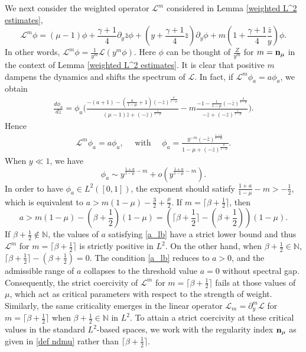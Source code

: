 \documentclass{article}
\newcommand{\ga}{\gamma}
\newcommand{\pa}{\partial}
\def\be{\begin{equation}}
\def\ee{\end{equation}}
\def\beqa{\begin{equation}\begin{aligned}}
\def\eeqa{\end{aligned}\end{equation}}
\def\ndmu{{\bf{n}_{\mu}}}
\numberwithin{equation}{section}
\begin{document}
We next consider the weighted operator 
$\mathcal L^m$ considered in Lemma \ref{weighted L^2 estimates}, 
\be
    \mathcal L^m \phi= (\mu-1)\phi +\frac{\ga+1}{4}\pa_y \bar z \phi +(y+\frac{\ga+1}{4}\bar z ) \pa_y \phi + m(1+\frac{\ga+1}{4}\frac{\bar z}{y})\phi.
\ee
In other words, $\mathcal L^m \phi = \frac{1}{y^m} \mathcal L (y^m \phi) $. Here $\phi$ can be thought of $\frac{Z}{y^m}$ for $m=\ndmu$ in the context of Lemma  \ref{weighted L^2 estimates}. It is clear that positive $m$ dampens the dynamics and shifts the spectrum of $\mathcal L$. %
In fact, if $\mathcal L^m  \phi_a = a\phi_a$, 
we obtain
\begin{align*}
    \frac{d\phi_a}{d \bar z} =  \phi_a \Big(\frac{-(a+1)-(\frac{a}{1-\mu}+1)(-\bar z)^{\frac{\mu}{1-\mu}}}{(\mu-1)\bar z +(-\bar z)^\frac{1}{1-\mu}}-m\frac{ -1-\frac{1}{1-\mu}(-\bar z)^{\frac{\mu}{1-\mu}} }{-\bar z +(-\bar z)^{\frac{1}{1-\mu}}}\Big).
\end{align*}
Hence
\beqa
    \mathcal L^m \phi_a  = a\phi_a,\quad \text{ with } \quad \phi_a = \frac{y^{-m}(-\bar z)^{\frac{1+a}{1-\mu}}}{1-\mu+(-\bar z )^{\frac{\mu}{1-\mu}}}.
\eeqa
When $y\ll 1$, we have
\be
    \phi_a \sim y^{\frac{1+a}{1-\mu}-m} + o(y^{\frac{1+a}{1-\mu}-m}).
\ee
In order to have $\phi_a\in L^2([0,1])$, the exponent should satisfy $\frac{1+a}{1-\mu}-m >-\frac12$, which is equivalent to $a> m(1-\mu)-\frac{3}{2}+\frac{\mu}{2}$. If $m=\lceil \beta+\frac12 \rceil$, then 
\be\label{a_lb}
   a> m(1-\mu) - (\beta+\frac12)(1-\mu) = ( \lceil \beta+\frac12 \rceil-(\beta+\frac12))(1-\mu).  %
\ee
If $\beta+\frac12 \notin \mathbb N $, the values of $a$ satisfying \eqref{a_lb}  have a strict lower bound and thus $\mathcal L^m$ for $m={\lceil \beta+\frac12 \rceil}$ is strictly positive in $L^2$. On the other hand,   
when $\beta+\frac12 \in \mathbb N$, $ \lceil \beta+\frac12 \rceil-(\beta+\frac12)=0$. The condition \eqref{a_lb} reduces to $a>0$, and  %
the admissible range of $a$ collapses to the threshold value $a=0$ without spectral gap. %
Consequently, the strict coercivity %
of $\mathcal L^m$ for $m={\lceil \beta+\frac12 \rceil}$ fails at those values of $\mu$, which act as critical parameters with respect to the strength of weight. Similarly, the same criticality emerges in the linear operator $\mathcal L_m = \partial_y^m \mathcal L$ for $m={\lceil \beta+\frac12 \rceil}$ when $\beta+\frac12 \in \mathbb N$ in $L^2$.  
To attain a strict coercivity at these critical values in the standard $L^2$-based spaces, we work with the regularity index $\ndmu$ as given in \eqref{def ndmu} rather than ${\lceil \beta+\frac12 \rceil}$. 
\end{document}
